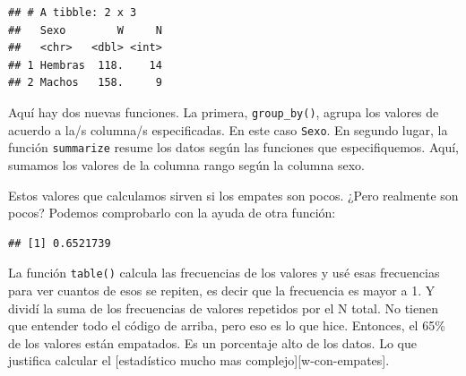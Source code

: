 \documentclass[]{book}
\newenvironment{Shaded}{\begin{snugshade}}{\end{snugshade}}
\newcommand{\DataTypeTok}[1]{\textcolor[rgb]{0.13,0.29,0.53}{#1}}
\newcommand{\DecValTok}[1]{\textcolor[rgb]{0.00,0.00,0.81}{#1}}
\newcommand{\KeywordTok}[1]{\textcolor[rgb]{0.13,0.29,0.53}{\textbf{#1}}}
\newcommand{\NormalTok}[1]{#1}
\newcommand{\OperatorTok}[1]{\textcolor[rgb]{0.81,0.36,0.00}{\textbf{#1}}}
\newcommand{\StringTok}[1]{\textcolor[rgb]{0.31,0.60,0.02}{#1}}
\theoremstyle{definition}
\theoremstyle{definition}
\theoremstyle{definition}
\theoremstyle{remark}
\begin{document}
\begin{Shaded}
\end{Shaded}

\begin{verbatim}
## # A tibble: 2 x 3
##   Sexo        W     N
##   <chr>   <dbl> <int>
## 1 Hembras  118.    14
## 2 Machos   158.     9
\end{verbatim}

Aquí hay dos nuevas funciones. La primera, \texttt{group\_by()}, agrupa
los valores de acuerdo a la/s columna/s especificadas. En este caso
\texttt{Sexo}. En segundo lugar, la función \texttt{summarize} resume
los datos según las funciones que especifiquemos. Aquí, sumamos los
valores de la columna rango según la columna sexo.

Estos valores que calculamos sirven si los empates son pocos. ¿Pero
realmente son pocos? Podemos comprobarlo con la ayuda de otra función:

\begin{Shaded}
\end{Shaded}

\begin{verbatim}
## [1] 0.6521739
\end{verbatim}

La función \texttt{table()} calcula las frecuencias de los valores y usé
esas frecuencias para ver cuantos de esos se repiten, es decir que la
frecuencia es mayor a 1. Y dividí la suma de los frecuencias de valores
repetidos por el N total. No tienen que entender todo el código de
arriba, pero eso es lo que hice. Entonces, el 65\% de los valores están
empatados. Es un porcentaje alto de los datos. Lo que justifica calcular
el {[}estadístico mucho mas complejo{]}{[}w-con-empates{]}.
\end{document}

